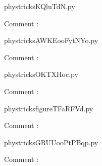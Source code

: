    \clearpage
    


    \newcommand{\CaptionFigKQluTdN}{<+Type your caption here+>}
    \begin{center}
        
    \end{center}
    phystricksKQluTdN.py

    Comment : 

    \clearpage
    


    \newcommand{\CaptionFigAWKEooFytNYo}{<+Type your caption here+>}
    \begin{center}
        
    \end{center}
    phystricksAWKEooFytNYo.py

    Comment : 

    \clearpage
    


    \newcommand{\CaptionFigOKTXHoc}{<+Type your caption here+>}
    \begin{center}
        
    \end{center}
    phystricksOKTXHoc.py

    Comment : 

    \clearpage
    


    \newcommand{\CaptionFigfigureTFaRFVd}{<+Type your caption here+>}
    \begin{center}
        
    \end{center}
    phystricksfigureTFaRFVd.py

    Comment : 

    \clearpage
    


    \newcommand{\CaptionFigGRUUooPtPBqp}{<+Type your caption here+>}
    \begin{center}
        
    \end{center}
    phystricksGRUUooPtPBqp.py

    Comment : 

    \clearpage
    


